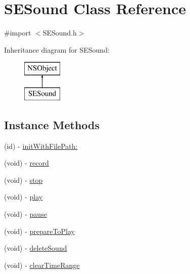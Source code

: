 \hypertarget{interface_s_e_sound}{\section{S\-E\-Sound Class Reference}
\label{interface_s_e_sound}
}


{\ttfamily \#import $<$S\-E\-Sound.\-h$>$}

Inheritance diagram for S\-E\-Sound\-:\begin{figure}[H]
\begin{center}
\leavevmode
\includegraphics[height=2.000000cm]{interface_s_e_sound}
\end{center}
\end{figure}
\subsection*{Instance Methods}
\begin{DoxyCompactItemize}
\item 
(id) -\/ \hyperlink{interface_s_e_sound_aab6d0929f0187e9908cdcc9d3f96cc43}{init\-With\-File\-Path\-:}
\item 
(void) -\/ \hyperlink{interface_s_e_sound_a6029d5eae755d92f9a233cf17419ac31}{record}
\item 
(void) -\/ \hyperlink{interface_s_e_sound_a97882088f16c74a517647ce7992337eb}{stop}
\item 
(void) -\/ \hyperlink{interface_s_e_sound_a4a8f6c4a6217a5e8cecbffccf7ab921d}{play}
\item 
(void) -\/ \hyperlink{interface_s_e_sound_a76b8a5e1805a83a8f652e94a16f7669a}{pause}
\item 
(void) -\/ \hyperlink{interface_s_e_sound_abf528c0bac121ce2f0d61144bfd9dabf}{prepare\-To\-Play}
\item 
(void) -\/ \hyperlink{interface_s_e_sound_abd2c45e2d5bb31980b72b7cd0aeaa555}{delete\-Sound}
\item 
(void) -\/ \hyperlink{interface_s_e_sound_aa242ebfc7e8a94948caa81ede5ab2611}{clear\-Time\-Range}
\end{DoxyCompactItemize}
